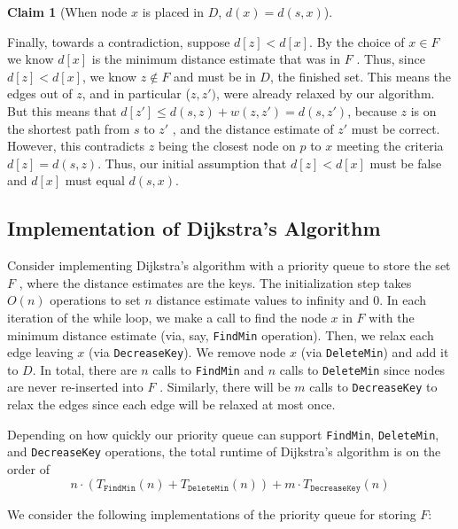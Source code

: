 \documentclass [12pt]{article}
\theoremstyle{definition}
\newtheorem{claim}{Claim}
\begin{document}
\begin{claim}[When node $x$ is placed in $D$, $d(x) = d(s,x)$]
\begin{enumerate}
    Finally, towards a contradiction, suppose $d[z] < d[x]$. By the choice of $x \in F$ we know $d[x]$ is the minimum distance estimate that was in $F$ . Thus, since $d[z] < d[x]$, we know $z \notin F$ and must be in $D$, the finished set. This means the edges out of $z$, and in particular ($z, z' )$, were already relaxed by our algorithm. But this means that $d[z ' ] \leq d(s, z) + w(z, z' ) = d(s, z' )$, because $z$ is on the shortest path from $s$ to $z '$ , and the distance estimate of $z '$ must be correct. However, this contradicts $z$ being the closest node on $p$ to $x$ meeting the criteria$ d[z] = d(s, z)$. Thus, our initial assumption that $d[z] < d[x]$ must be false and $d[x]$ must equal $d(s, x)$.
\end{enumerate}
\end{claim}


\subsection{Implementation of Dijkstra's Algorithm}

Consider implementing Dijkstra's algorithm with a priority queue to store the set $F$ , where the distance estimates are the keys. The initialization step takes $O(n)$ operations to set $n$ distance estimate values to infinity and $0$. In each iteration of the while loop, we make a call to find the node $x$ in $F$ with the minimum distance estimate (via, say, \texttt{FindMin} operation). Then, we relax each edge leaving $x$ (via \texttt{DecreaseKey}). We remove node $x$ (via \texttt{DeleteMin}) and add it to $D$. In total, there are $n$ calls to \texttt{FindMin} and $n$ calls to \texttt{DeleteMin} since nodes are never re-inserted into $F$ . Similarly, there will be $m$ calls to \texttt{DecreaseKey} to relax the edges since each edge will be relaxed at most once.

Depending on how quickly our priority queue can support \texttt{FindMin}, \texttt{DeleteMin}, and \texttt{DecreaseKey} operations, the total runtime of Dijkstra's algorithm is on the order of
$$
n \cdot(T_{\texttt{FindMin}}(n) + T_{\texttt{DeleteMin}}(n)) + m \cdot T_{\texttt{DecreaseKey}}(n)
$$ 

We consider the following implementations of the priority queue for storing $F$:
\end{document}
